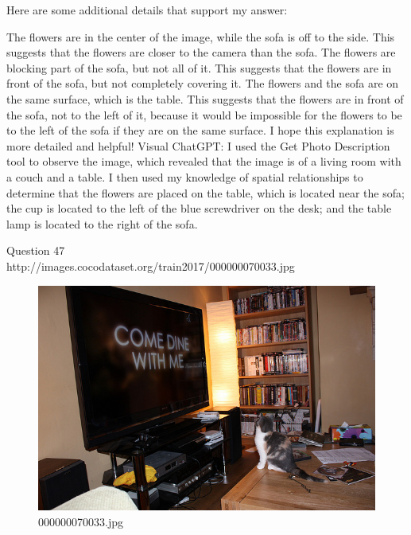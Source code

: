 \begin{enumerate}
    Here are some additional details that support my answer:
    
    The flowers are in the center of the image, while the sofa is off to the side. This suggests that the flowers are closer to the camera than the sofa.
    The flowers are blocking part of the sofa, but not all of it. This suggests that the flowers are in front of the sofa, but not completely covering it.
    The flowers and the sofa are on the same surface, which is the table. This suggests that the flowers are in front of the sofa, not to the left of it, because it would be impossible for the flowers to be to the left of the sofa if they are on the same surface.
    I hope this explanation is more detailed and helpful!
    \subitem Visual ChatGPT: I used the Get Photo Description tool to observe the image, which revealed that the image is of a living room with a couch and a table. I then used my knowledge of spatial relationships to determine that the flowers are placed on the table, which is located near the sofa; the cup is located to the left of the blue screwdriver on the desk; and the table lamp is located to the right of the sofa.
\end{enumerate}
Question 47\\
http://images.cocodataset.org/train2017/000000070033.jpg
\begin{figure}[h]
    \centering
    \includegraphics[width=0.8\linewidth]{../image set/hard/000000070033.jpg}
    \caption{000000070033.jpg}
\end{figure}
